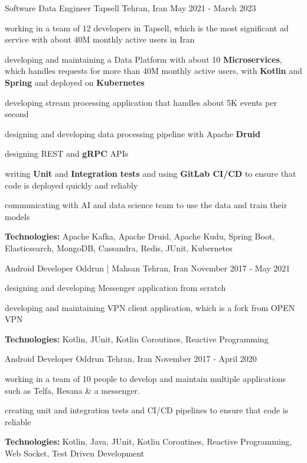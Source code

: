 \begin{cventries}
    \cventry
    {Software Data Engineer} %
    {Tapsell} %
    {Tehran, Iran} %
    {May 2021 - March 2023} %
    {
      \begin{cvitems} %
        \item working in a team of 12 developers in Tapsell, which is the most significant ad service with about 40M monthly active users in Iran
        \item developing and maintaining a Data Platform with about 10 \textbf{Microservices}, which handles requests for more than 40M monthly active users, with \textbf{Kotlin} and 
        \textbf{Spring} and deployed on \textbf{Kubernetes} 
        \item developing stream processing application that handles about 5K events per second
        \item designing and developing data processing pipeline with Apache \textbf{Druid}
        \item designing REST and \textbf{gRPC} APIs
        \item writing \textbf{Unit} and \textbf{Integration tests} and using \textbf{GitLab CI/CD} to ensure that code is deployed quickly and reliably
        \item communicating with AI and data science team to use the data and train their models
        \item \textbf{Technologies:} Apache Kafka, Apache Druid, Apache Kudu, Spring Boot, Elasticsearch, MongoDB, Cassandra, Redis, JUnit, Kubernetes
      \end{cvitems}
    }

    \cventry
    {Android Developer} %
    {Oddrun | Mahsan} %
    {Tehran, Iran} %
    {November 2017 - May 2021} %
    {
      \begin{cvitems} %
        \item designing and developing Messenger application from scratch
        \item developing and maintaining VPN client application, which is a fork from OPEN VPN
        \item \textbf{Technologies:} Kotlin, JUnit, Kotlin Coroutines, Reactive Programming
      \end{cvitems}
    }

    \cventry
    {Android Developer} %
    {Oddrun} %
    {Tehran, Iran} %
    {November 2017 - April 2020} %
    { 
      \begin{cvitems} %
        \item working in a team of 10 people to develop and maintain multiple applications such as Telfa, Resana \& a messenger.
        \item creating unit and integration tests and CI/CD pipelines to ensure that code is reliable
        \item \textbf{Technologies:} Kotlin, Java, JUnit, Kotlin Coroutines, Reactive Programming, Web Socket, Test Driven Development
      \end{cvitems}
    }

\end{cventries}
